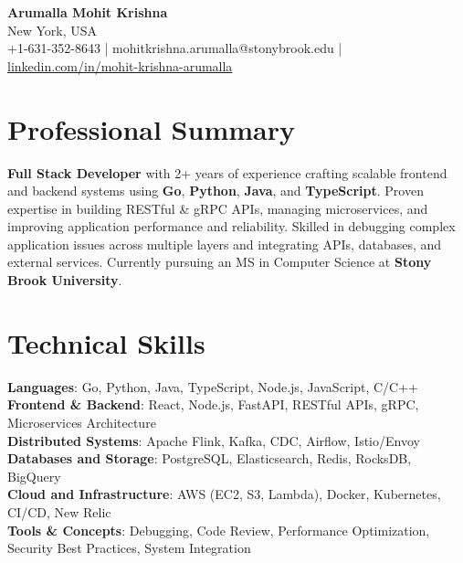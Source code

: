 \documentclass[letterpaper,11pt]{article}
\begin{document}
\begin{center}
  {\Large \textbf{Arumalla Mohit Krishna}} \\
  New York, USA \\
  +1-631-352-8643 \enspace | \enspace mohitkrishna.arumalla@stonybrook.edu \enspace | \enspace \href{https://www.linkedin.com/in/mohit-krishna-arumalla}{linkedin.com/in/mohit-krishna-arumalla}
\end{center}

\section{Professional Summary}
  \begin{itemize}[leftmargin=0.15in, label={}]
    \small{\item{
     \textbf{Full Stack Developer} with 2+ years of experience crafting scalable frontend and backend systems using \textbf{Go}, \textbf{Python}, \textbf{Java}, and \textbf{TypeScript}. Proven expertise in building RESTful \& gRPC APIs, managing microservices, and improving application performance and reliability. Skilled in debugging complex application issues across multiple layers and integrating APIs, databases, and external services. Currently pursuing an MS in Computer Science at \textbf{Stony Brook University}.
    }}
  \end{itemize}
\vspace{-16pt}

\section{Technical Skills}
 \begin{itemize}[leftmargin=0.15in, label={}]
    \small{\item{
     \textbf{Languages}: Go, Python, Java, TypeScript, Node.js, JavaScript, C/C++ \\
     \textbf{Frontend \& Backend}: React, Node.js, FastAPI, RESTful APIs, gRPC, Microservices Architecture \\
     \textbf{Distributed Systems}: Apache Flink, Kafka, CDC, Airflow, Istio/Envoy \\
     \textbf{Databases and Storage}: PostgreSQL, Elasticsearch, Redis, RocksDB, BigQuery \\
     \textbf{Cloud and Infrastructure}: AWS (EC2, S3, Lambda), Docker, Kubernetes, CI/CD, New Relic \\
     \textbf{Tools \& Concepts}: Debugging, Code Review, Performance Optimization, Security Best Practices, System Integration
    }}
 \end{itemize}
\vspace{-16pt}
\end{document}
